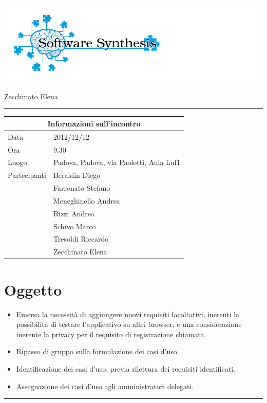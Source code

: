 \documentclass[a4paper,10pt,openright]{article}
\begin{document}
\includegraphics[width=1.5\textwidth]{logo}

\begin{center}

\begin{Large}
\hspace{1.2cm}{Verbale d'incontro 2012/12/12}
\newline
\end{Large}

\begin{small}
	Zecchinato Elena
\end{small}

\noindent\rule{\textwidth}{0.4pt}
\newline

\begin{tabular}{ll}
\toprule
\multicolumn{2}{c}{\sffamily Informazioni sull'incontro}\\
\midrule
Data & 2012/12/12 \\
Ora & 9:30 \\
Luogo & Padova, Padova, via Paolotti, Aula Luf1 \\
Partecipanti & Beraldin Diego \\ & Farronato Stefano \\ & Meneghinello Andrea \\ & Rizzi Andrea \\ & Schivo Marco \\ & Tresoldi Riccardo \\ & Zecchinato Elena\\
\bottomrule
\end{tabular}

\end{center}

\section*{Oggetto}
\begin{itemize}
	\item Emersa la necessità di aggiungere nuovi requisiti facoltativi, inerenti la possibilità di testare l'applicativo su altri browser, e una considerazione inerente la privacy per il requisito di registrazione chiamata.
	\item Ripasso di gruppo sulla formulazione dei casi d'uso.
	\item Identificazione dei casi d'uso, previa rilettura dei requisiti identificati.
	\item Assegnazione dei casi d'uso agli amministratori delegati.
\end{itemize}
\noindent\rule{\textwidth}{0.4pt}
\end{document}
